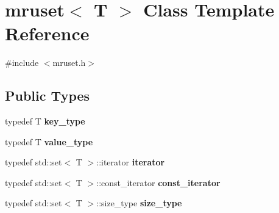 \hypertarget{classmruset}{}\section{mruset$<$ T $>$ Class Template Reference}
\label{classmruset}


{\ttfamily \#include $<$mruset.\+h$>$}

\subsection*{Public Types}
\begin{DoxyCompactItemize}
\item 
\mbox{\label{classmruset_a282941ee7f0438b0c09274b10c78cda0}} 
typedef T {\bfseries key\+\_\+type}
\item 
\mbox{\label{classmruset_a834c3e7f8e9cf615ebe27752443f9a3a}} 
typedef T {\bfseries value\+\_\+type}
\item 
\mbox{\label{classmruset_a246172eda1afff45be47a013c14b1ad6}} 
typedef std\+::set$<$ T $>$\+::iterator {\bfseries iterator}
\item 
\mbox{\label{classmruset_a74c77f7642e8e4db7cc79991c4345692}} 
typedef std\+::set$<$ T $>$\+::const\+\_\+iterator {\bfseries const\+\_\+iterator}
\item 
\mbox{\label{classmruset_aaee46af18d8a5bdc503e9570e499a335}} 
typedef std\+::set$<$ T $>$\+::size\+\_\+type {\bfseries size\+\_\+type}
\end{DoxyCompactItemize}

